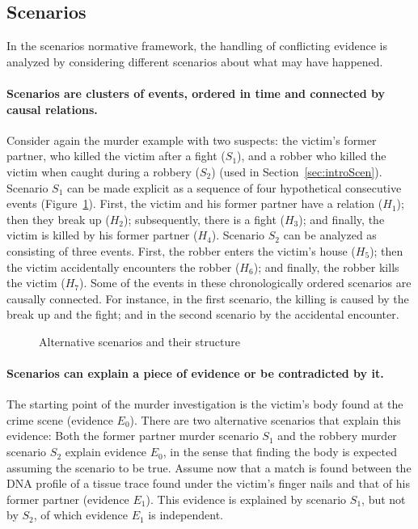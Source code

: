 \documentclass[10pt]{article}
\begin{document}
\subsection{Scenarios}

In the scenarios normative framework, the handling of conflicting evidence is analyzed by considering different scenarios about what may have happened.

\paragraph{Scenarios are clusters of events, ordered in time and connected by causal relations.} Consider again the murder example with two suspects: the victim's former partner, who killed the victim after a fight ($S_1$), and a robber who killed the victim when caught during a robbery ($S_2$) (used in Section~\ref{sec:introScen}). Scenario $S_1$ can be made explicit as a sequence of four hypothetical consecutive events (Figure~\ref{fig:scens}). First, the victim and his former partner have a relation ($H_1$); then they break up ($H_2$); subsequently, there is a fight ($H_3$); and finally, the victim is killed by his former partner ($H_4$). Scenario $S_2$ can be analyzed as consisting of three events. First, the robber enters the victim's house ($H_5$); then the victim accidentally encounters the robber ($H_6$); and finally, the robber kills the victim ($H_7$). Some of the events in these chronologically ordered scenarios are causally connected. For instance, in the first scenario, the killing is caused by the break up and the fight; and in the second scenario by the accidental encounter.

\begin{figure}[bt]
\centering

\caption{Alternative scenarios and their structure\label{fig:scens}}
\end{figure}

\paragraph{Scenarios can explain a piece of evidence or be contradicted by it.} The starting point of the murder investigation is the victim's body found at the crime scene (evidence $E_0$). There are two alternative scenarios that explain this evidence: Both the former partner murder scenario $S_1$ and the robbery murder scenario $S_2$ explain evidence $E_0$, in the sense that finding the body is expected assuming the scenario to be true. Assume now that a match is found between the DNA profile of a tissue trace found under the victim's finger nails and that of his former partner (evidence $E_1$). This evidence is explained by scenario $S_1$, but not by $S_2$, of which evidence $E_1$ is independent. 
\end{document}
